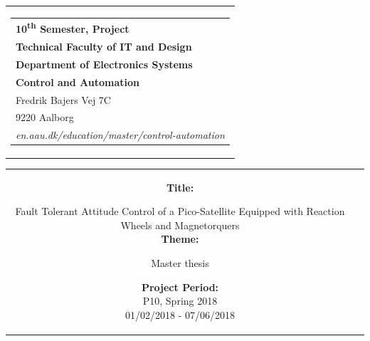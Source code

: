 % 
\begin{nopagebreak}
{\samepage 

\begin{tabular}{r}
\parbox{\textwidth}{  
\hfill \hspace{2cm} \parbox{8cm}{\begin{tabular}{l} %
{\small \textbf{\textcolor{aaublue}{\colorbox{white}{10\textsuperscript{th} Semester, Project}}}}\\
{\small \textbf{\textcolor{aaublue}{Technical Faculty of IT and Design}}}\\
{\small \textbf{\textcolor{aaublue}{Department of
	Electronics Systems}}}\\ 
{\small \textbf{\textcolor{aaublue}{Control and Automation}}}\\
{\small \textcolor{aaublue}{Fredrik Bajers Vej 7C}} \\
{\small \textcolor{aaublue}{9220 Aalborg}} \\
{\small \textcolor{aaublue}{\emph{en.aau.dk/education/master/control-automation}}}
\end{tabular}}}
\end{tabular}

\begin{tabular}{cc}
\parbox{7cm}{

\textbf{Title:}

Fault Tolerant Attitude Control of a Pico-Satellite Equipped with Reaction Wheels
and Magnetorquers \\ %

\textbf{Theme:}

\small{
 Master thesis\\
}


\parbox{8cm}{


\textbf{Project Period:}\\
P10, Spring 2018\\
01/02/2018 - 07/06/2018\\
   
}}
\end{tabular}}
\end{nopagebreak}
